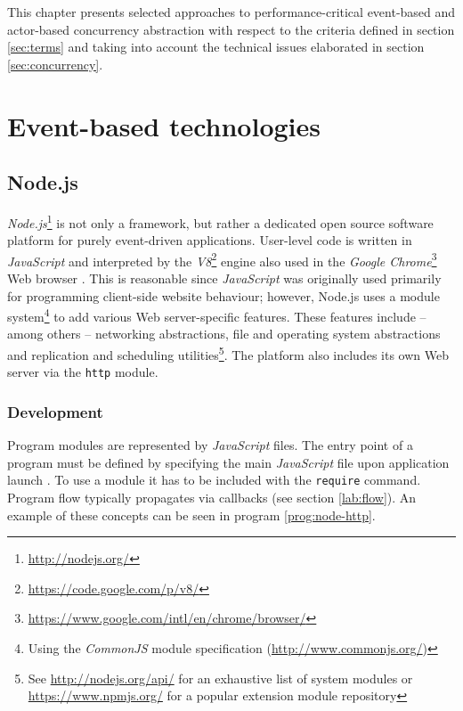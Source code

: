 This chapter presents selected approaches to performance-critical event-based and actor-based concurrency abstraction with respect to the criteria defined in section \ref{sec:terms} and taking into account the technical issues elaborated in section \ref{sec:concurrency}.

\section{Event-based technologies}

\subsection{Node.js}

\textit{Node.js}\footnote{\url{http://nodejs.org/}} is not only a framework, but rather a dedicated open source software platform for purely event-driven applications. User-level code is written in \textit{JavaScript} and interpreted by the \textit{V8}\footnote{\url{https://code.google.com/p/v8/}} engine also used in the \textit{Google Chrome}\footnote{\url{https://www.google.com/intl/en/chrome/browser/}} Web browser \cite[p. 19]{Hughes-Croucher2012}. This is reasonable since \textit{JavaScript} was originally used primarily for programming client-side website behaviour; however, Node.js uses a module system\footnote{Using the \textit{CommonJS} module specification (\url{http://www.commonjs.org/})} to add various Web server-specific features. These features include -- among others -- networking abstractions, file and operating system abstractions and replication and scheduling utilities\footnote{See \url{http://nodejs.org/api/} for an exhaustive list of system modules or \url{https://www.npmjs.org/} for a popular extension module repository}. The platform also includes its own Web server via the \texttt{http} module.

\subsubsection*{Development}
\label{lab:nodehttp}
Program modules are represented by \textit{JavaScript} files. The entry point of a program must be defined by specifying the main \textit{JavaScript} file upon application launch \cite[p. 16]{Hughes-Croucher2012}. To use a module it has to be included with the \texttt{require} command. Program flow typically propagates via callbacks (see section \ref{lab:flow}). An example of these concepts can be seen in program \ref{prog:node-http}.

